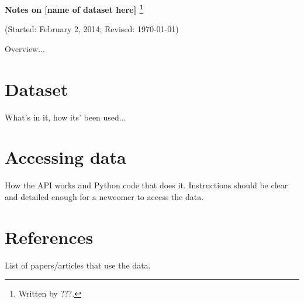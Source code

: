 \documentclass[11pt]{article}
\begin{document}
\bigskipamount
\parindent=0.0in
\thispagestyle{empty}

\bigskip
\centerline{\Large \bf Notes on [name of dataset here]%
\footnote{Written by ???.}}
\centerline{(Started: February 2, 2014; Revised: \today)}

\bigskip
Overview...  


\section{Dataset}

What's in it, how its' been used...  



\section{Accessing data} 

How the API works and Python code that does it.  
Instructions should be clear and detailed enough for a newcomer to access the data.  


\section{References}


List of papers/articles that use the data.  
\end{document}
